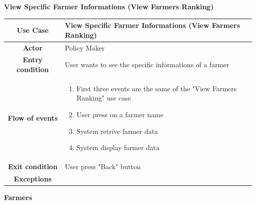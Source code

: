 \documentclass[table, 12pt]{article}
\begin{document}
\begin{itemize}
            
            \begin{table}[H]
                \item[] \textbf{View Specific Farmer Informations (View Farmers Ranking)}
                \item[] 
                \centering
                \begin{tabular}{c m{}}
                    \hline
                    \textbf{Use Case} & View Specific Farmer Informations (View Farmers Ranking)\\ \hline
                    \textbf{Actor} & Policy Maker\\ \hline
                    \textbf{Entry condition} & User wants to see the specific informations of a farmer\\  \hline
                    \textbf{Flow of events} & \begin{enumerate}
                                                \item First three events are the same of the "View Farmers Ranking" use case 
                                                \item User press on a farmer name
                                                \item System retrive farmer data 
                                                \item System display farmer data
                                            \end{enumerate}\\ \hline
                    \textbf{Exit condition} & User press "Back" button\\ \hline
                    \textbf{Exceptions} &  \\ \hline                    
                \end{tabular}
            \end{table}
            
            \item \textbf {Farmers}
            

\end{itemize}
\end{document}
